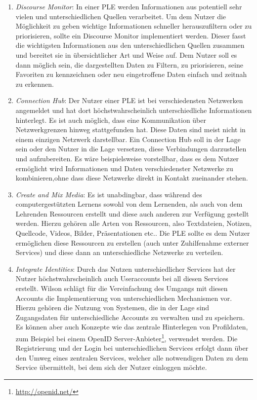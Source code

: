 \begin{enumerate}
 \item \emph{Discourse Monitor}\label{wilson_patterns:discourse_monitor}: In einer PLE werden Informationen aus potentiell sehr vielen und unterschiedlichen Quellen verarbeitet. Um dem Nutzer die Möglichkeit zu geben wichtige Informationen schneller herauszufiltern oder zu priorisieren, sollte ein Discourse Monitor implementiert werden. Dieser fasst die wichtigsten Informationen aus den unterschiedlichen Quellen zusammen und bereitet sie in übersichtlicher Art und Weise auf. Dem Nutzer soll es dann möglich sein, die dargestellten Daten zu Filtern, zu priorisieren, seine Favoriten zu kennzeichnen oder neu eingetroffene Daten einfach und zeitnah zu erkennen. 
 \item \emph{Connection Hub}: Der Nutzer einer PLE ist bei verschiedensten Netzwerken angemeldet und hat dort höchstwahrscheinlich unterschiedliche Informationen hinterlegt. Es ist auch möglich, dass eine Kommunikation über Netzwerkgrenzen hinweg stattgefunden hat. Diese Daten sind meist nicht in einem einzigen Netzwerk darstellbar. Ein Connection Hub soll in der Lage sein oder den Nutzer in die Lage versetzen, diese Verbindungen darzustellen und aufzubereiten. Es wäre beispielsweise vorstellbar, dass es dem Nutzer ermöglicht wird Informationen und Daten verschiedenster Netzwerke zu kombinieren,ohne dass diese Netzwerke direkt in Kontakt zueinander stehen.
 \item \emph{Create and Mix Media}: Es ist unabdingbar, dass während des computergestützten Lernens sowohl von dem Lernenden, als auch von dem Lehrenden Ressourcen erstellt und diese auch anderen zur Verfügung gestellt werden. Hierzu gehören alle Arten von Ressourcen, also Textdateien, Notizen, Quellcode, Videos, Bilder, Präsentationen etc.. Die PLE sollte es dem Nutzer ermöglichen diese Ressourcen zu erstellen (auch unter Zuhilfenahme externer Services) und diese dann an unterschiedliche Netzwerke zu verteilen. 
 \item \emph{Integrate Identities}: Durch das Nutzen unterschiedlicher Services hat der Nutzer höchstwahrscheinlich auch Useraccounts bei all diesen Services erstellt. Wilson schlägt für die Vereinfachung des Umgangs mit diesen Accounts die Implementierung von unterschiedlichen Mechanismen vor. Hierzu gehören die Nutzung von Systemen, die in der Lage sind Zugangsdaten für unterschiedliche Accounts zu verwalten und zu speichern. Es können aber auch Konzepte wie das zentrale Hinterlegen von Profildaten, zum Beispiel bei einem OpenID Server-Anbieter\footnote{\url{http://openid.net/}}, verwendet werden. Die Registrierung und der Login bei unterschiedlichen Services erfolgt dann über den Umweg eines zentralen Services, welcher alle notwendigen Daten zu dem Service übermittelt, bei dem sich der Nutzer einloggen möchte.  

\end{enumerate}
